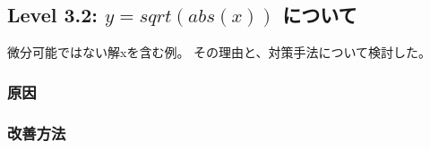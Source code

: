 \subsection{Level 3.2: $y = sqrt(abs(x))$ について}
微分可能ではない解xを含む例。
その理由と、対策手法について検討した。

\subsubsection{原因}
\subsubsection{改善方法}
